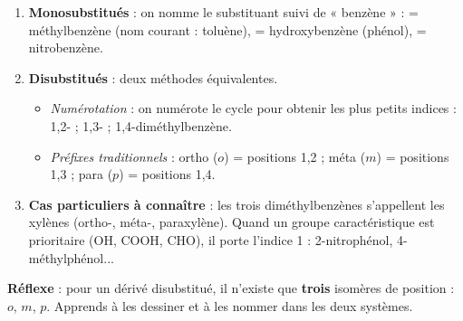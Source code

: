 \documentclass[11pt]{article}
\newcommand{\cle}[1]{{\popxbold\color{popdark}#1}}
\begin{document}
\begin{methode}
\begin{enumerate}
\item \textbf{Monosubstitués} : on nomme le substituant suivi de « benzène » :  = méthylbenzène (nom courant : \cle{toluène}),  = hydroxybenzène (\cle{phénol}),  = nitrobenzène.
\item \textbf{Disubstitués} : deux méthodes équivalentes.
\begin{itemize}
\item \emph{Numérotation} : on numérote le cycle pour obtenir les plus petits indices : 1,2- ; 1,3- ; 1,4-diméthylbenzène.
\item \emph{Préfixes traditionnels} : \cle{ortho} ($o$) = positions 1,2 ; \cle{méta} ($m$) = positions 1,3 ; \cle{para} ($p$) = positions 1,4.
\end{itemize}
\item \textbf{Cas particuliers à connaître} : les trois diméthylbenzènes s'appellent les \cle{xylènes} (ortho-, méta-, paraxylène). Quand un groupe caractéristique est prioritaire (OH, COOH, CHO), il porte l'indice 1 : 2-nitrophénol, 4-méthylphénol...
\end{enumerate}
\textbf{Réflexe} : pour un dérivé disubstitué, il n'existe que \textbf{trois} isomères de position : $o$, $m$, $p$. Apprends à les dessiner et à les nommer dans les deux systèmes.
\end{methode}
\end{document}
